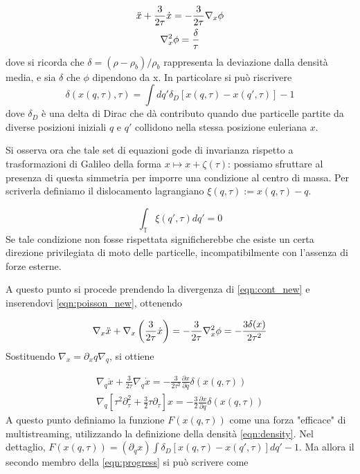 \begin{gather}
    \label{eqn:cont_new}
    \ddot{x} + \frac{3}{2\tau}\dot{x} = - \frac{3}{2\tau}\nabla_x \phi \\
    \label{eqn:poisson_new}
    \laplacian_x\phi = \frac{\delta}{\tau}
\end{gather}
dove si ricorda che $\delta = (\rho - \rho_b)/\rho_b$ rappresenta la deviazione dalla densità media, e sia $\delta$
che $\phi$ dipendono da x. In particolare si può riscrivere 
\begin{equation}
    \label{eqn:density}
    \delta(x(q, \tau), \tau) = \int dq' \delta_D[x(q, \tau)-x(q', \tau)] - 1
\end{equation}
dove $\delta_D$ è una delta di Dirac che dà contributo quando due particelle partite da diverse
posizioni iniziali $q$ e $q'$ collidono nella stessa posizione euleriana $x$.

Si osserva ora che tale set di equazioni gode di invarianza rispetto a trasformazioni di 
Galileo della forma $x \mapsto x + \zeta(\tau)$: possiamo sfruttare al presenza di questa 
simmetria per imporre una condizione al centro di massa. Per scriverla definiamo il dislocamento
lagrangiano $\xi(q, \tau):= x(q, \tau) - q$.

\begin{equation}
    \label{eqn:com}
    \int_{\mathbb{T}}\xi(q', \tau) dq' = 0
\end{equation}
Se tale condizione non fosse rispettata significherebbe che esiste un certa direzione
privilegiata di moto delle particelle, incompatibilmente con l'assenza di forze esterne.

A questo punto si procede prendendo la divergenza di \ref{eqn:cont_new} e inserendovi 
\ref{eqn:poisson_new}, ottenendo

\begin{equation}
    \nabla_x \ddot{x} + \nabla_x \left(\frac{3}{2\tau}\dot{x}\right) = -\frac{3}{2\tau}\laplacian_x\phi = -\frac{3\delta(x)}{2\tau^2}
\end{equation}
Sostituendo $\nabla_x = \partial_x q \nabla_q$, si ottiene

\begin{gather}
    \nabla_q \ddot{x} + \frac{3}{2\tau} \nabla_q\dot{x} = -\frac{3}{2\tau^2}\frac{\partial x}{\partial q}\delta(x(q,\tau)) \\
    \label{eqn:progress}
    \nabla_q \left[ \tau^2 \partial^2_{\tau} + \frac{3}{2}\tau \partial_{\tau} \right] x = -\frac{3}{2}\frac{\partial x}{\partial q}\delta(x(q,\tau))
\end{gather}
A questo punto definiamo la funzione $F(x(q, \tau))$ come una forza "efficace" di multistreaming, utilizzando 
la definizione della densità \ref{eqn:density}. Nel dettaglio, $F(x(q, \tau)) = (\partial_q x) \int \delta_D[x(q, \tau)-x(q', \tau)]dq' -1$.
Ma allora il secondo membro della \ref{eqn:progress} si può scrivere come

